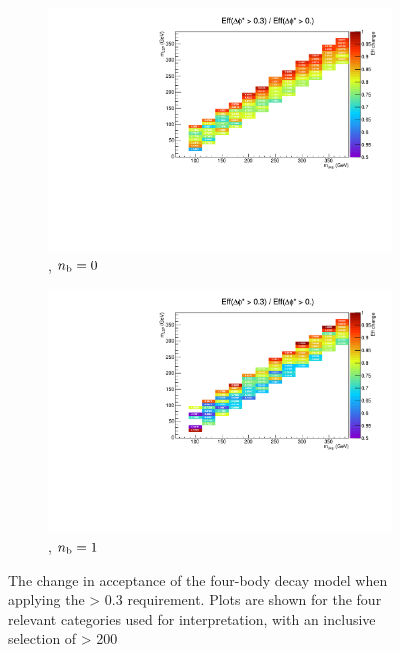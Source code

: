 \begin{figure}[h!]
  \begin{subfigure}[b]{0.46\textwidth}
    \includegraphics[width=\textwidth]
    {Figs/sms/t2degen/v19/eff_changes/eff_compare_2d_T2_4body_v19_vs_T2_4body_v20_eq0b_ge4j}
    \caption{\njhigh, $n_{\text{b}} = 0$}
    \label{fig:t2degen_dphistar_eq0b_ge4j}
  \end{subfigure}
  \begin{subfigure}[b]{0.46\textwidth}
    \includegraphics[width=\textwidth]
    {Figs/sms/t2degen/v19/eff_changes/eff_compare_2d_T2_4body_v19_vs_T2_4body_v20_eq1b_ge4j}
    \caption{\njhigh, $n_{\text{b}} = 1$}
    \label{fig:t2degen_dphistar_eq1b_ge4j}
  \end{subfigure}
  \caption{The change in acceptance of the four-body decay model when applying
  the \mindphistar > 0.3 requirement. Plots are shown for the four relevant
  categories used for interpretation, with an inclusive selection of \HT >
  200~\gev}
  \label{fig:t2degen_dphistar_effchange}
\end{figure}

